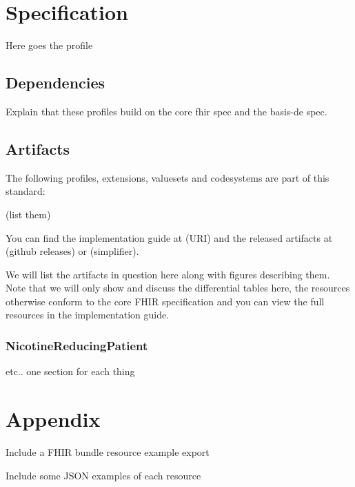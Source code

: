 \documentclass[12px]{report}
\begin{document}
\chapter{Specification}

Here goes the profile

\section{Dependencies}
Explain that these profiles build on the core fhir spec and the basis-de spec.

\section{Artifacts}
The following profiles, extensions, valuesets and codesystems are part of this standard:

(list them)

You can find the implementation guide at (URI) and the released artifacts at (github releases) or (simplifier).

We will list the artifacts in question here along with figures describing them. Note that we will only show and discuss the differential tables here, the resources otherwise conform to the core FHIR specification and you can view the full resources in the implementation guide.

\subsection{NicotineReducingPatient}

etc.. one section for each thing

\chapter{Appendix}

Include a FHIR bundle resource example export

Include some JSON examples of each resource
\end{document}
